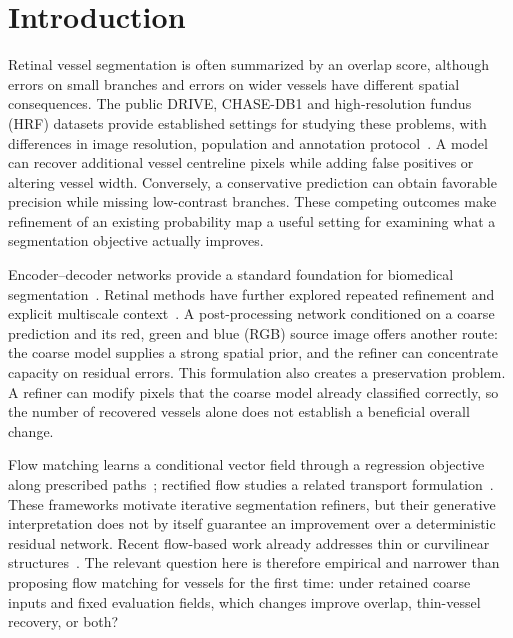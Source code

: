 \documentclass[jimaging,article,submit,pdftex,moreauthors]{Definitions/mdpi}
\begin{document}
\section{Introduction}\label{sec:introduction}
Retinal vessel segmentation is often summarized by an overlap score, although errors on small branches and errors on wider vessels have different spatial consequences. The public DRIVE, CHASE-DB1 and high-resolution fundus (HRF) datasets provide established settings for studying these problems, with differences in image resolution, population and annotation protocol~\cite{Staal2004,Fraz2012,Odstrcilik2013}. A model can recover additional vessel centreline pixels while adding false positives or altering vessel width. Conversely, a conservative prediction can obtain favorable precision while missing low-contrast branches. These competing outcomes make refinement of an existing probability map a useful setting for examining what a segmentation objective actually improves.

Encoder--decoder networks provide a standard foundation for biomedical segmentation~\cite{Ronneberger2015}. Retinal methods have further explored repeated refinement and explicit multiscale context~\cite{Li2020IterNet,Wu2021SCSNet}. A post-processing network conditioned on a coarse prediction and its red, green and blue (RGB) source image offers another route: the coarse model supplies a strong spatial prior, and the refiner can concentrate capacity on residual errors. This formulation also creates a preservation problem. A refiner can modify pixels that the coarse model already classified correctly, so the number of recovered vessels alone does not establish a beneficial overall change.

Flow matching learns a conditional vector field through a regression objective along prescribed paths~\cite{Lipman2023}; rectified flow studies a related transport formulation~\cite{Liu2023RectifiedFlow}. These frameworks motivate iterative segmentation refiners, but their generative interpretation does not by itself guarantee an improvement over a deterministic residual network. Recent flow-based work already addresses thin or curvilinear structures~\cite{Asadi2026FMS2,SidElMoctar2026CurvSegFlow}. The relevant question here is therefore empirical and narrower than proposing flow matching for vessels for the first time: under retained coarse inputs and fixed evaluation fields, which changes improve overlap, thin-vessel recovery, or both?
\end{document}
